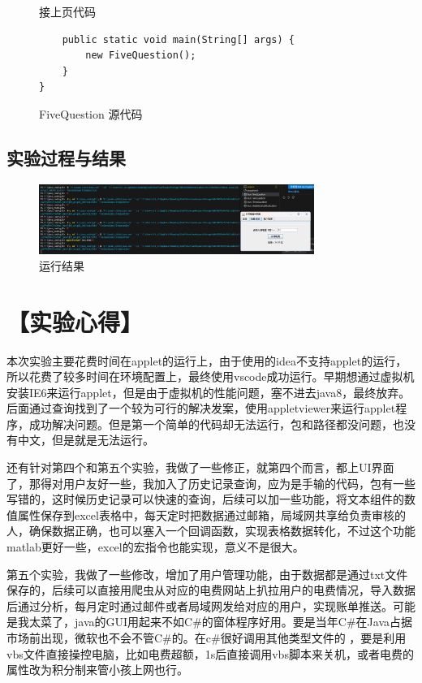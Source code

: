 \documentclass[12pt,a4paper]{article}
\begin{document}
\begin{figure}[H]
接上页代码
\begin{lstlisting}
    public static void main(String[] args) {
        new FiveQuestion();
    }
}

\end{lstlisting}

\caption{FiveQuestion 源代码}
\end{figure}

\subsection*{实验过程与结果}

\begin{figure}[H]
\centering
\includegraphics[width=0.8\textwidth]{five.png}
\caption{运行结果}
\end{figure}

\section*{【实验心得】}
    本次实验主要花费时间在applet的运行上，由于使用的idea不支持applet的运行，所以花费了较多时间在环境配置上，最终使用vscode成功运行。早期想通过虚拟机安装IE6来运行applet，但是由于虚拟机的性能问题，塞不进去java8，最终放弃。
后面通过查询找到了一个较为可行的解决发案，使用appletviewer来运行applet程序，成功解决问题。但是第一个简单的代码却无法运行，包和路径都没问题，也没有中文，但是就是无法运行。

    还有针对第四个和第五个实验，我做了一些修正，就第四个而言，都上UI界面了，那得对用户友好一些，我加入了历史记录查询，应为是手输的代码，包有一些写错的，这时候历史记录可以快速的查询，后续可以加一些功能，将文本组件的数值属性保存到excel表格中，每天定时把数据通过邮箱，局域网共享给负责审核的人，确保数据正确，也可以塞入一个回调函数，实现表格数据转化，不过这个功能matlab更好一些，excel的宏指令也能实现，意义不是很大。

    第五个实验，我做了一些修改，增加了用户管理功能，由于数据都是通过txt文件保存的，后续可以直接用爬虫从对应的电费网站上扒拉用户的电费情况，导入数据后通过分析，每月定时通过邮件或者局域网发给对应的用户，实现账单推送。可能是我太菜了，java的GUI用起来不如C\#的窗体程序好用。要是当年C\#在Java占据市场前出现，微软也不会不管C\#的。在c\#很好调用其他类型文件的
，要是利用vbs文件直接操控电脑，比如电费超额，1s后直接调用vbs脚本来关机，或者电费的属性改为积分制来管小孩上网也行。
\end{document}
